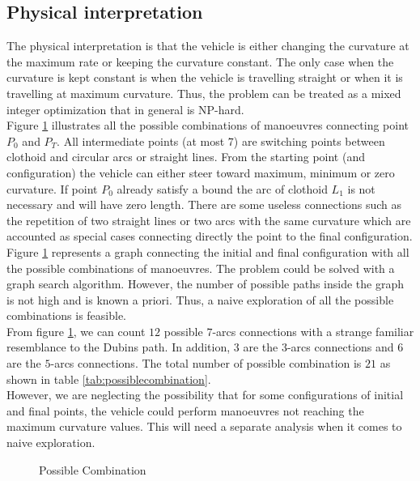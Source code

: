 \documentclass[11pt,twocolumn]{scrartcl}
\begin{document}
\subsection*{Physical interpretation}
%
The physical interpretation is that the vehicle is either changing the curvature at the maximum rate or keeping the curvature constant.
The only case when the curvature is kept constant is when the vehicle is travelling straight or when it is travelling at maximum curvature.
Thus, the problem can be treated as a mixed integer optimization that in general is NP-hard.\\
%
Figure \ref{fig:possiblecombination} illustrates all the possible combinations of manoeuvres connecting point $P_0$ and $P_T$. All intermediate points (at most $7$) are switching points between clothoid and circular arcs or straight lines. From the starting point (and configuration) the vehicle can either steer toward maximum, minimum or zero curvature. If point $P_0$ already satisfy a bound the arc of clothoid $L_1$ is not necessary and will have zero length.
There are some useless connections such as the repetition of two straight lines or two arcs with the same curvature which are accounted as special cases connecting directly the point to the final configuration.\\
%
Figure \ref{fig:possiblecombination} represents a graph connecting the initial and final configuration with all the possible combinations of manoeuvres. The problem could be solved with a graph search algorithm. However, the number of possible paths inside the graph is not high and is known a priori. Thus, a naive exploration of all the possible combinations is feasible.\\
%
From figure \ref{fig:possiblecombination}, we can count $12$ possible $7$-arcs connections with a strange familiar resemblance to the Dubins path. In addition, $3$ are the $3$-arcs connections and $6$ are the $5$-arcs connections. The total number of possible combination is $21$ as shown in table \ref{tab:possiblecombination}.\\
%
However, we are neglecting the possibility that for some configurations of initial and final points, the vehicle could perform manoeuvres not reaching the maximum curvature values. This will need a separate analysis when it comes to naive exploration.  
%
\begin{figure}[ht]
  \centering
  \resizebox{1.1\linewidth}{!}{%
  }%
  \caption{Possible Combination}
  \label{fig:possiblecombination}
\end{figure}
\end{document}
